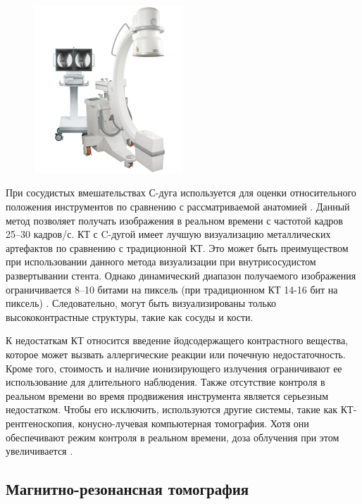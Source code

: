 \begin{figure}[!h]
\begin{center}
\includegraphics[width=0.5\textwidth]{Рисунки/КТ2.png}
\caption{\centering {}}
\label{част}
\end{center}
\end{figure}

При сосудистых вмешательствах С-дуга используется для оценки относительного положения инструментов по сравнению с рассматриваемой анатомией \cite{litlink11}. Данный метод позволяет получать изображения в реальном времени с частотой кадров 25–30 кадров/с. КТ с C-дугой имеет лучшую визуализацию металлических артефактов по сравнению с традиционной КТ. Это может быть преимуществом при использовании данного метода визуализации при внутрисосудистом развертывании стента. Однако динамический диапазон получаемого изображения ограничивается 8–10 битами на пиксель (при традиционном КТ 14-16 бит на пиксель) \cite{litlink19}. Следовательно, могут быть визуализированы только высококонтрастные структуры, такие как сосуды и кости.

К недостаткам КТ относится введение йодсодержащего контрастного вещества, которое может вызвать аллергические реакции или почечную недостаточность. Кроме того, стоимость и наличие ионизирующего излучения ограничивают ее использование для длительного наблюдения. Также отсутствие контроля в реальном времени во время продвижения инструмента является серьезным недостатком. Чтобы его исключить, используются другие системы, такие как КТ-рентгеноскопия, конусно-лучевая компьютерная томография. Хотя они обеспечивают режим контроля в реальном времени, доза облучения при этом увеличивается \cite{litlink15}.

\subsection{Магнитно-резонансная томография}

